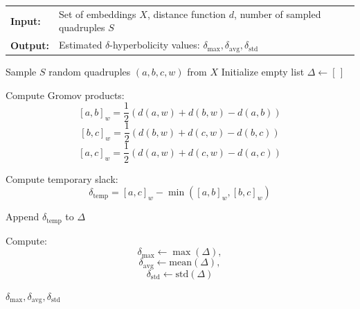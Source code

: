 \documentclass[]{Liebert_Author_revised}
\begin{document}
\begin{algorithm}[h]
\caption{Compute $\delta$-Hyperbolicity}
\label{alg_hyperbolicity}
\small
\noindent
\begin{tabular}{p{1cm}p{6.8cm}}
\textbf{Input:}  & Set of embeddings \( X \), distance function \( d \), number of sampled quadruples \( S \) \\
\textbf{Output:} & Estimated $\delta$-hyperbolicity values: \( \delta_{\max}, \delta_{\text{avg}}, \delta_{\text{std}} \)
\end{tabular}

\begin{algorithmic}[1]

\STATE Sample \( S \) random quadruples \( (a, b, c, w) \) from \( X \)
\STATE Initialize empty list \( \Delta \leftarrow [\,] \)


    \STATE Compute Gromov products: 
    \[
    [a, b]_w = \frac{1}{2} \left( d(a, w) + d(b, w) - d(a, b) \right)
    \]
    \[
    [b, c]_w = \frac{1}{2} \left( d(b, w) + d(c, w) - d(b, c) \right)
    \]
    \[
    [a, c]_w = \frac{1}{2} \left( d(a, w) + d(c, w) - d(a, c) \right)
    \]

     \STATE Compute temporary slack:
    \[
    \delta_{\text{temp}} = [a, c]_w - \min\left( [a, b]_w, [b, c]_w \right)
    \]


    \STATE Append \( \delta_{\text{temp}} \) to \( \Delta \)
\ENDFOR

\STATE Compute:
\[
\delta_{\max} \leftarrow \max(\Delta), \]
\[
\delta_{\text{avg}} \leftarrow \text{mean}(\Delta), \]
\[
\delta_{\text{std}} \leftarrow \text{std}(\Delta)
\]

\RETURN \( \delta_{\max}, \delta_{\text{avg}}, \delta_{\text{std}} \)

\end{algorithmic}
\end{algorithm}
\end{document}
